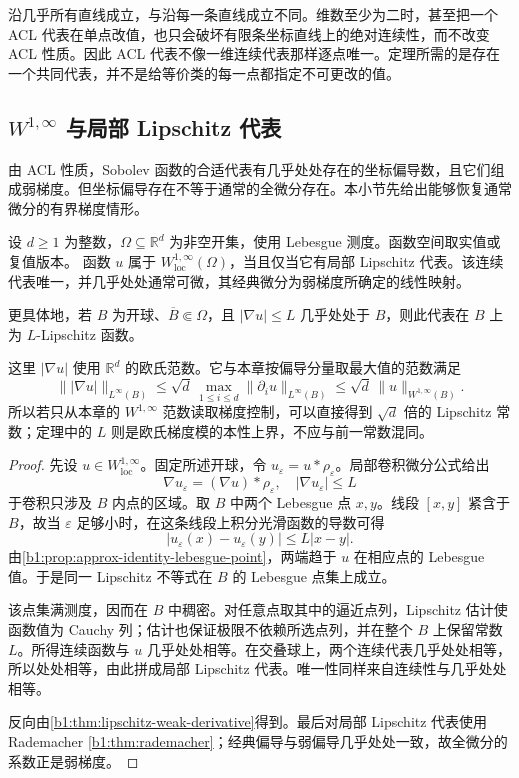 沿几乎所有直线成立，与沿每一条直线成立不同。维数至少为二时，甚至把一个 ACL 代表在单点改值，也只会破坏有限条坐标直线上的绝对连续性，而不改变 ACL 性质。因此 ACL 代表不像一维连续代表那样逐点唯一。定理所需的是存在一个共同代表，并不是给等价类的每一点都指定不可更改的值。

\subsection{\texorpdfstring{\(W^{1,\infty}\)}{W1,infinity} 与局部 Lipschitz 代表}
\label{b1:subsec:210403}

由 ACL 性质，Sobolev 函数的合适代表有几乎处处存在的坐标偏导数，且它们组成弱梯度。但坐标偏导存在不等于通常的全微分存在。本小节先给出能够恢复通常微分的有界梯度情形。

\begin{theorem}\label{b1:thm:w1infty-lipschitz}
设 \(d\geq1\) 为整数，\(\Omega\subseteq\mathbb R^d\) 为非空开集，使用 Lebesgue 测度。函数空间取实值或复值版本。
函数 \(u\) 属于 \(W^{1,\infty}_{\mathrm{loc}}(\Omega)\)，当且仅当它有局部 Lipschitz 代表。该连续代表唯一，并几乎处处通常可微，其经典微分为弱梯度所确定的线性映射。

\ProseParagraphBreak

更具体地，若 \(B\) 为开球、\(\overline B\Subset\Omega\)，且 \(|\nabla u|\leq L\) 几乎处处于 \(B\)，则此代表在 \(B\) 上为 \(L\)-Lipschitz 函数。
\end{theorem}

这里 \(|\nabla u|\) 使用 \(\mathbb R^d\) 的欧氏范数。它与本章按偏导分量取最大值的范数满足
\[
 \bigl\||\nabla u|\bigr\|_{L^\infty(B)}
 \leq \sqrt d\,\max_{1\leq i\leq d}\|\partial_i u\|_{L^\infty(B)}
 \leq \sqrt d\,\|u\|_{W^{1,\infty}(B)}.
\]
所以若只从本章的 \(W^{1,\infty}\) 范数读取梯度控制，可以直接得到 \(\sqrt d\) 倍的 Lipschitz 常数；定理中的 \(L\) 则是欧氏梯度模的本性上界，不应与前一常数混同。

\begin{proof}
先设 \(u\in W^{1,\infty}_{\mathrm{loc}}\)。固定所述开球，令 \(u_\varepsilon=u*\rho_\varepsilon\)。局部卷积微分公式给出
\[
 \nabla u_\varepsilon=(\nabla u)*\rho_\varepsilon,
 \quad |\nabla u_\varepsilon|\leq L
\]
于卷积只涉及 \(B\) 内点的区域。取 \(B\) 中两个 Lebesgue 点 \(x,y\)。线段 \([x,y]\) 紧含于 \(B\)，故当 \(\varepsilon\) 足够小时，在这条线段上积分光滑函数的导数可得
\[
 |u_\varepsilon(x)-u_\varepsilon(y)|\leq L|x-y|.
\]
由\cref{b1:prop:approx-identity-lebesgue-point}，两端趋于 \(u\) 在相应点的 Lebesgue 值。于是同一 Lipschitz 不等式在 \(B\) 的 Lebesgue 点集上成立。

该点集满测度，因而在 \(B\) 中稠密。对任意点取其中的逼近点列，Lipschitz 估计使函数值为 Cauchy 列；估计也保证极限不依赖所选点列，并在整个 \(B\) 上保留常数 \(L\)。所得连续函数与 \(u\) 几乎处处相等。在交叠球上，两个连续代表几乎处处相等，所以处处相等，由此拼成局部 Lipschitz 代表。唯一性同样来自连续性与几乎处处相等。

反向由\cref{b1:thm:lipschitz-weak-derivative}得到。最后对局部 Lipschitz 代表使用 Rademacher \cref{b1:thm:rademacher}；经典偏导与弱偏导几乎处处一致，故全微分的系数正是弱梯度。
\end{proof}

